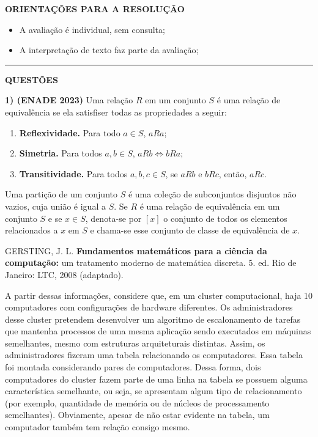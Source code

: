\documentclass[12pt,a4paper]{article}
\begin{document}
\vspace{0.3cm}

\textbf{ORIENTAÇÕES PARA A RESOLUÇÃO}  

\begin{itemize}
    \item A avaliação é individual, sem consulta;
    \item A interpretação de texto faz parte da avaliação;
\end{itemize}

\vspace{0.5cm}

\begin{center}
    \rule{\textwidth}{0.4pt}
    \textbf{QUESTÕES}
\end{center}

\vspace{0.5cm}

\textbf{1) (ENADE 2023)} Uma relação $R$ em um conjunto $S$ é uma relação de equivalência se ela satisfiser todas as propriedades a seguir:
\begin{enumerate}
    \item \textbf{Reflexividade.} Para todo $a \in S$, $a R a$;
    \item \textbf{Simetria.} Para todos $a, b \in S$, $a R b \Leftrightarrow b R a$;
    \item \textbf{Transitividade.} Para todos $a, b, c \in S$, se $a R b$ e $b R c$, então, $a R c$.
\end{enumerate}

Uma partição de um conjunto $S$ é uma coleção de subconjuntos disjuntos não vazios, cuja união é igual a $S$. Se $R$ é uma relação de equivalência em um conjunto $S$ e se $x \in S$, denota-se por $[x]$ o conjunto de todos os elementos relacionados a $x$ em $S$ e chama-se esse conjunto de classe de equivalência de $x$.

\vspace{0.2cm}
\footnotesize
GERSTING, J. L. \textbf{Fundamentos matemáticos para a ciência da computação:} um tratamento moderno de matemática discreta. 5. ed. Rio de Janeiro: LTC, 2008 (adaptado).
\normalsize
\vspace{0.2cm}

A partir dessas informações, considere que, em um cluster computacional, haja 10 computadores com configurações de hardware diferentes. Os administradores desse cluster pretendem desenvolver um algoritmo de escalonamento de tarefas que mantenha processos de uma mesma aplicação sendo executados em máquinas semelhantes, mesmo com estruturas arquiteturais distintas. Assim, os administradores fizeram uma tabela relacionando os computadores. Essa tabela foi montada considerando pares de computadores. Dessa forma, dois computadores do cluster fazem parte de uma linha na tabela se possuem alguma característica semelhante, ou seja, se apresentam algum tipo de relacionamento (por exemplo, quantidade de memória ou de núcleos de processamento semelhantes). Obviamente, apesar de não estar evidente na tabela, um computador também tem relação consigo mesmo.
\end{document}
